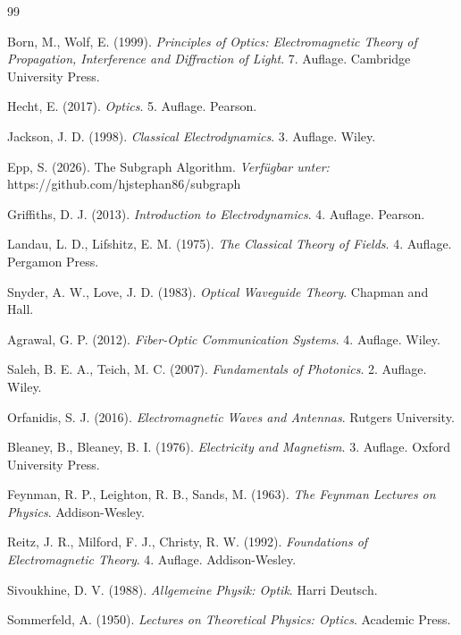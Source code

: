 \documentclass[a4paper,12pt]{article}
\theoremstyle{definition}
\theoremstyle{remark}
\begin{document}
\begin{thebibliography}{99}

Born, M., Wolf, E. (1999). \textit{Principles of Optics: Electromagnetic Theory of Propagation, Interference and Diffraction of Light}. 7. Auflage. Cambridge University Press.

Hecht, E. (2017). \textit{Optics}. 5. Auflage. Pearson.

Jackson, J. D. (1998). \textit{Classical Electrodynamics}. 3. Auflage. Wiley.

Epp, S. (2026). The Subgraph Algorithm. \textit{Verfügbar unter:} https://github.com/hjstephan86/subgraph

Griffiths, D. J. (2013). \textit{Introduction to Electrodynamics}. 4. Auflage. Pearson.

Landau, L. D., Lifshitz, E. M. (1975). \textit{The Classical Theory of Fields}. 4. Auflage. Pergamon Press.

Snyder, A. W., Love, J. D. (1983). \textit{Optical Waveguide Theory}. Chapman and Hall.

Agrawal, G. P. (2012). \textit{Fiber-Optic Communication Systems}. 4. Auflage. Wiley.

Saleh, B. E. A., Teich, M. C. (2007). \textit{Fundamentals of Photonics}. 2. Auflage. Wiley.

Orfanidis, S. J. (2016). \textit{Electromagnetic Waves and Antennas}. Rutgers University.

Bleaney, B., Bleaney, B. I. (1976). \textit{Electricity and Magnetism}. 3. Auflage. Oxford University Press.

Feynman, R. P., Leighton, R. B., Sands, M. (1963). \textit{The Feynman Lectures on Physics}. Addison-Wesley.

Reitz, J. R., Milford, F. J., Christy, R. W. (1992). \textit{Foundations of Electromagnetic Theory}. 4. Auflage. Addison-Wesley.

Sivoukhine, D. V. (1988). \textit{Allgemeine Physik: Optik}. Harri Deutsch.

Sommerfeld, A. (1950). \textit{Lectures on Theoretical Physics: Optics}. Academic Press.

\end{thebibliography}
\end{document}
